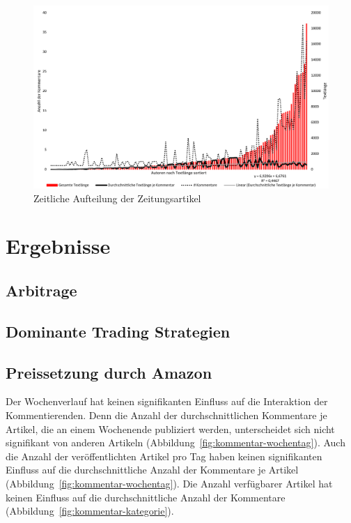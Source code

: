 \documentclass[12pt,a4paper,oneside]{article}
\begin{document}
\begin{titlepage}
\begin{flushleft}


\newpage
\begin{landscape}
\begin{figure}[h!]
\includegraphics[height=.85\textheight]{erste_Artikelauswertung_cropped.pdf}%
\caption{Zeitliche Aufteilung der Zeitungsartikel}
\label{fig:lorenz-kommentar}
\end{figure}
\end{landscape}
\newpage


\newpage
\section{Ergebnisse}
\subsection{Arbitrage}
\subsection{Dominante Trading Strategien}
\subsection{Preissetzung durch Amazon}


Der Wochenverlauf hat keinen signifikanten Einfluss auf die Interaktion der Kommentierenden. Denn die Anzahl der durchschnittlichen Kommentare je Artikel, die an einem Wochenende publiziert werden, unterscheidet sich nicht signifikant von anderen Artikeln (Abbildung~\ref{fig:kommentar-wochentag}). Auch die Anzahl der ver\-öffentlich\-ten Artikel pro Tag haben keinen signifikanten Einfluss auf die durchschnittliche Anzahl der Kommentare je Artikel (Abbildung~\ref{fig:kommentar-wochentag}). Die Anzahl verfüg\-bar\-er Artikel hat keinen Einfluss auf die durchschnittliche Anzahl der Kommentare (Abbildung~\ref{fig:kommentar-kategorie}).


\end{flushleft}
\end{titlepage}
\end{document}
